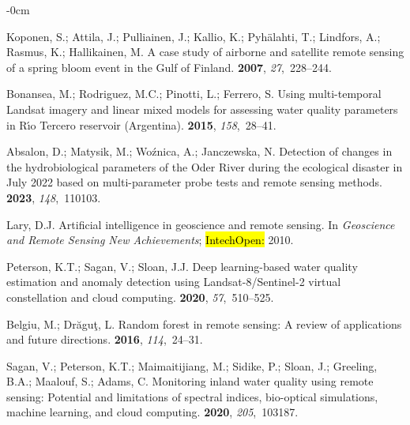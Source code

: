 \documentclass[remotesensing,article,accept,pdftex,moreauthors]{Definitions/mdpi}
\begin{document}
\begin{adjustwidth}{-\extralength}{0cm}
\begin{thebibliography}{999}
Koponen, S.; Attila, J.; Pulliainen, J.; Kallio, K.; Pyh{\"a}lahti, T.;
  Lindfors, A.; Rasmus, K.; Hallikainen, M.
\newblock A case study of airborne and satellite remote sensing of a spring
  bloom event in the Gulf of Finland.
 {\bf 2007}, {\em 27},~228--244.

Bonansea, M.; Rodriguez, M.C.; Pinotti, L.; Ferrero, S.
\newblock Using multi-temporal Landsat imagery and linear mixed models for
  assessing water quality parameters in R{\'\i}o Tercero reservoir (Argentina).
 {\bf 2015}, {\em 158},~28--41.

Absalon, D.; Matysik, M.; Wo{\'z}nica, A.; Janczewska, N.
\newblock Detection of changes in the hydrobiological parameters of the Oder
  River during the ecological disaster in July 2022 based on multi-parameter
  probe tests and remote sensing methods.
 {\bf 2023}, {\em 148},~110103.

Lary, D.J.
\newblock Artificial intelligence in geoscience and remote sensing. In {\em
  Geoscience and Remote Sensing New Achievements}; \hl{IntechOpen:} %
  2010.

Peterson, K.T.; Sagan, V.; Sloan, J.J.
\newblock Deep learning-based water quality estimation and anomaly detection
  using Landsat-8/Sentinel-2 virtual constellation and cloud computing.
 {\bf 2020}, {\em 57},~510--525.

Belgiu, M.; Dr{\u{a}}gu{\c{t}}, L.
\newblock Random forest in remote sensing: A review of applications and future
  directions.
 {\bf 2016},
  {\em 114},~24--31.

Sagan, V.; Peterson, K.T.; Maimaitijiang, M.; Sidike, P.; Sloan, J.; Greeling,
  B.A.; Maalouf, S.; Adams, C.
\newblock Monitoring inland water quality using remote sensing: Potential and
  limitations of spectral indices, bio-optical simulations, machine learning,
  and cloud computing.
 {\bf 2020}, {\em 205},~103187.


\end{thebibliography}
\end{adjustwidth}
\end{document}
